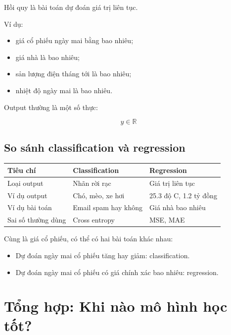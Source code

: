 \documentclass[12pt,a4paper]{report}
\begin{document}
Hồi quy là bài toán dự đoán giá trị liên tục.

Ví dụ:

\begin{itemize}
    \item giá cổ phiếu ngày mai bằng bao nhiêu;
    \item giá nhà là bao nhiêu;
    \item sản lượng điện tháng tới là bao nhiêu;
    \item nhiệt độ ngày mai là bao nhiêu.
\end{itemize}

Output thường là một số thực:

\[
    y \in \mathbb{R}
\]

\section{So sánh classification và regression}

\begin{center}
\begin{tabular}{p{}p{}p{}}
\toprule
Tiêu chí & Classification & Regression \\
\midrule
Loại output & Nhãn rời rạc & Giá trị liên tục \\
Ví dụ output & Chó, mèo, xe hơi & 25.3 độ C, 1.2 tỷ đồng \\
Ví dụ bài toán & Email spam hay không & Giá nhà bao nhiêu \\
Sai số thường dùng & Cross entropy & MSE, MAE \\
\bottomrule
\end{tabular}
\end{center}

\begin{vidu}
Cùng là giá cổ phiếu, có thể có hai bài toán khác nhau:

\begin{itemize}
    \item Dự đoán ngày mai cổ phiếu tăng hay giảm: classification.
    \item Dự đoán ngày mai cổ phiếu có giá chính xác bao nhiêu: regression.
\end{itemize}
\end{vidu}

\chapter{Tổng hợp: Khi nào mô hình học tốt?}
\end{document}
